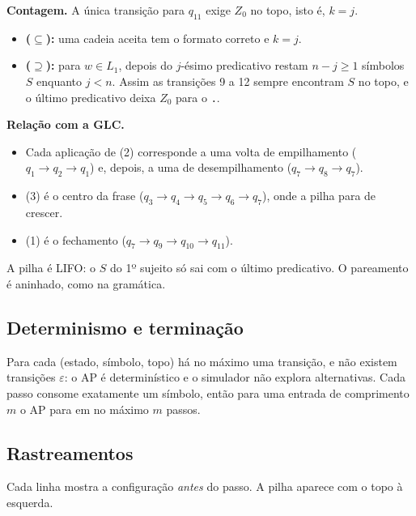\documentclass[11pt,a4paper]{article}
\newcommand{\cad}[1]{\texttt{#1}}       %
\newcommand{\Lum}{L_1}
\begin{document}
\textbf{Contagem.} A única transição para $q_{11}$ exige $Z_0$ no topo, isto é, $k=j$.
\begin{itemize}
  \item \textbf{($\subseteq$):} uma cadeia aceita tem o formato correto e $k=j$.
  \item \textbf{($\supseteq$):} para $w\in\Lum$, depois do $j$-ésimo predicativo restam $n-j\ge1$ símbolos $S$ enquanto $j<n$. Assim as transições 9 a 12 sempre encontram $S$ no topo, e o último predicativo deixa $Z_0$ para o \cad{.}.
\end{itemize}

\textbf{Relação com a GLC.}
\begin{itemize}
  \item Cada aplicação de (2) corresponde a uma volta de empilhamento ($q_1\to q_2\to q_1$) e, depois, a uma de desempilhamento ($q_7\to q_8\to q_7$).
  \item (3) é o centro da frase ($q_3\to q_4\to q_5\to q_6\to q_7$), onde a pilha para de crescer.
  \item (1) é o fechamento ($q_7\to q_9\to q_{10}\to q_{11}$).
\end{itemize}
A pilha é LIFO: o $S$ do 1º sujeito só sai com o último predicativo. O pareamento é aninhado, como na gramática.

\subsection{Determinismo e terminação}

Para cada (estado, símbolo, topo) há no máximo uma transição, e não existem transições $\varepsilon$: o AP é determinístico e o simulador não explora alternativas. Cada passo consome exatamente um símbolo, então para uma entrada de comprimento $m$ o AP para em no máximo $m$ passos.

\subsection{Rastreamentos}

Cada linha mostra a configuração \emph{antes} do passo. A pilha aparece com o topo à esquerda.
\end{document}
